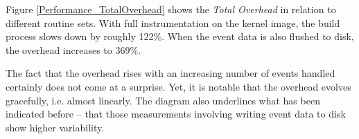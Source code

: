 %
%


Figure \ref{Performance_TotalOverhead} shows the \emph{Total Overhead} in relation to 
different routine sets. With full instrumentation on the kernel image, the build process
slows down by roughly 122\%. When the event data is also flushed to disk, the overhead 
increases to 369\%.

The fact that the overhead rises with an increasing number of events handled certainly 
does not come at a surprise. Yet, it is notable that the overhead evolves gracefully, 
i.e. almost linearly. The diagram also underlines what has been indicated before -- 
that those measurements involving writing event data to disk show higher variability.

